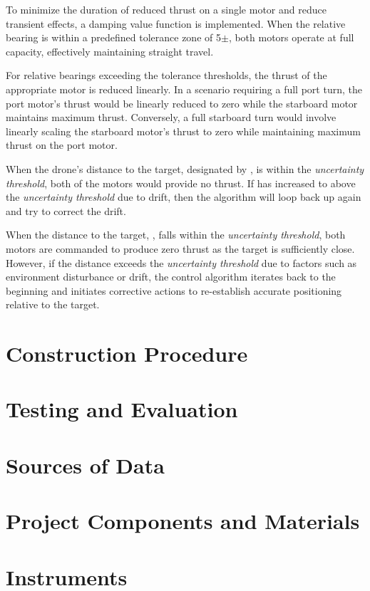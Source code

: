 \begin{enumerate}
        To minimize the duration of reduced thrust on a single motor and reduce transient effects, a damping value function is implemented. When the relative bearing is within a predefined
        tolerance zone of 5\degrees$\pm$, both motors operate at full capacity, effectively maintaining straight travel.

        For relative bearings exceeding the tolerance thresholds, the thrust of the appropriate motor is reduced linearly. In a scenario requiring a full port turn, the port motor's thrust 
        would be linearly reduced to zero while the starboard motor maintains maximum thrust. Conversely, a full starboard turn would involve linearly scaling the starboard motor's thrust to 
        zero while maintaining maximum thrust on the port motor.

        When the drone's distance to the target, designated by \distance, is within the \emph{uncertainty threshold}, both of the motors would provide no thrust. If \distance has increased to 
        above the \emph{uncertainty threshold} due to drift, then the algorithm will loop back up again and try to correct the drift.
\end{enumerate}

When the distance to the target, \distance, falls within the \emph{uncertainty threshold}, both motors are commanded to produce zero thrust as the target is sufficiently close. However,
if the distance exceeds the \emph{uncertainty threshold} due to factors such as environment disturbance or drift, the control algorithm iterates back to the beginning and initiates corrective
actions to re-establish accurate positioning relative to the target.

\section{Construction Procedure}

\section{Testing and Evaluation}

\section{Sources of Data}

\section{Project Components and Materials}

\section{Instruments}
